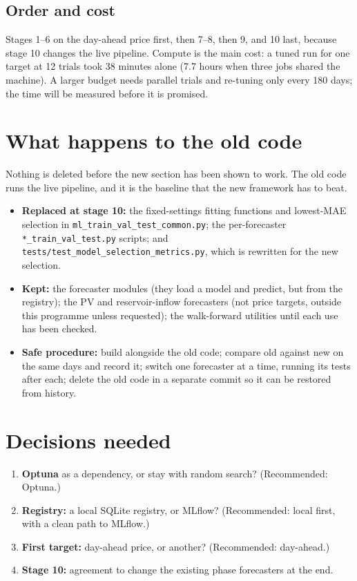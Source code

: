 \documentclass[11pt,a4paper]{article}
\begin{document}
\subsection{Order and cost}

Stages 1--6 on the day-ahead price first, then 7--8, then 9, and 10 last, because stage 10 changes the live pipeline.
Compute is the main cost: a tuned run for one target at 12 trials took 38 minutes alone (7.7 hours when three jobs shared
the machine). A larger budget needs parallel trials and re-tuning only every 180 days; the time will be measured before it
is promised.

\section{What happens to the old code}

Nothing is deleted before the new section has been shown to work. The old code runs the live pipeline, and it is the
baseline that the new framework has to beat.

\begin{itemize}
\item \textbf{Replaced at stage 10:} the fixed-settings fitting functions and lowest-MAE selection in
      \texttt{ml\_\allowbreak train\_\allowbreak val\_\allowbreak test\_\allowbreak common.py}; the per-forecaster \texttt{*\_train\_val\_test.py} scripts; and
      \texttt{tests/\allowbreak test\_\allowbreak model\_\allowbreak selection\_\allowbreak metrics.py}, which is rewritten for the new selection.
\item \textbf{Kept:} the forecaster modules (they load a model and predict, but from the registry); the PV and
      reservoir-inflow forecasters (not price targets, outside this programme unless requested); the walk-forward utilities
      until each use has been checked.
\item \textbf{Safe procedure:} build alongside the old code; compare old against new on the same days and record it;
      switch one forecaster at a time, running its tests after each; delete the old code in a separate commit so it can be
      restored from history.
\end{itemize}

\section{Decisions needed}

\begin{enumerate}
\item \textbf{Optuna} as a dependency, or stay with random search? (Recommended: Optuna.)
\item \textbf{Registry:} a local SQLite registry, or MLflow? (Recommended: local first, with a clean path to MLflow.)
\item \textbf{First target:} day-ahead price, or another? (Recommended: day-ahead.)
\item \textbf{Stage 10:} agreement to change the existing phase forecasters at the end.
\end{enumerate}
\end{document}
